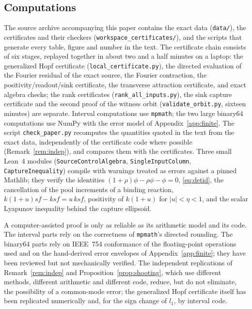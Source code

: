 \documentclass[11pt,a4paper]{article}
\theoremstyle{plain}
\theoremstyle{definition}
\theoremstyle{remark}
\newcommand{\abs}[1]{\lvert#1\rvert}
\begin{document}
\subsection{Computations}
The source archive accompanying this paper contains the exact data (\texttt{data/}), the certificates and their checkers (\texttt{workspace\_certificates/}), and the scripts that generate every table, figure and number in the text. The certificate chain consists of six stages, replayed together in about two and a half minutes on a laptop: the generalized Hopf certificate (\texttt{local\_certificate.py}), the directed evaluation of the Fourier residual of the exact source, the Fourier contraction, the positivity/readout/sink certificate, the transverse attraction certificate, and exact algebra checks; the rank certificates (\texttt{rank\_all\_inputs.py}), the sink capture certificate and the second proof of the witness orbit (\texttt{validate\_orbit.py}, sixteen minutes) are separate. Interval computations use \texttt{mpmath}; the two large binary64 computations use NumPy with the error model of Appendix~\ref{app:finite}. The script \texttt{check\_paper.py} recomputes the quantities quoted in the text from the exact data, independently of the certificate code where possible (Remark~\ref{rem:indep}), and compares them with the certificates. Three small Lean~4 modules (\texttt{SourceControlAlgebra}, \texttt{SingleInputColumn}, \texttt{CaptureInequality}) compile with warnings treated as errors against a pinned Mathlib; they verify the identities $(1+\rho)\phi-\rho\phi-\phi=0$, \eqref{eq:detid}, the cancellation of the pool increments of a binding reaction, $k(1+u)sf-ksf=u\,ksf$, positivity of $k(1+u)$ for $\abs u<\eta<1$, and the scalar Lyapunov inequality behind the capture ellipsoid.

A computer-assisted proof is only as reliable as its arithmetic model and its code. The interval parts rely on the correctness of \texttt{mpmath}'s directed rounding. The binary64 parts rely on IEEE~754 conformance of the floating-point operations used and on the hand-derived error envelopes of Appendix~\ref{app:finite}; they have been reviewed but not mechanically verified. The independent replications of Remark~\ref{rem:indep} and Proposition~\ref{prop:shooting}, which use different methods, different arithmetic and different code, reduce, but do not eliminate, the possibility of a common-mode error; the generalized Hopf certificate itself has been replicated numerically and, for the sign change of $l_1$, by interval code.
\end{document}
